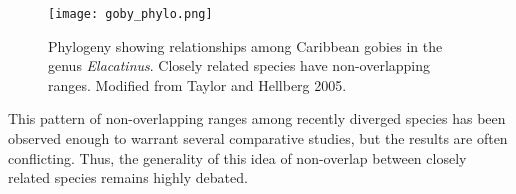 \documentclass[11pt, hidelinks]{article}
\begin{document}
\begin{figure}[tb]
	\centering
		\texttt{[image: goby\_phylo.png]}  
		\caption{Phylogeny showing relationships among Caribbean gobies in the genus \emph{Elacatinus}. Closely related species have non-overlapping ranges. Modified from Taylor and Hellberg 2005.\label{elacatinus}}
\end{figure}

This pattern of non-overlapping ranges among recently diverged species has been observed enough to warrant several comparative studies, but the results are often conflicting.  Thus, the generality of this idea of non-overlap between closely related species remains highly debated.
\end{document}
